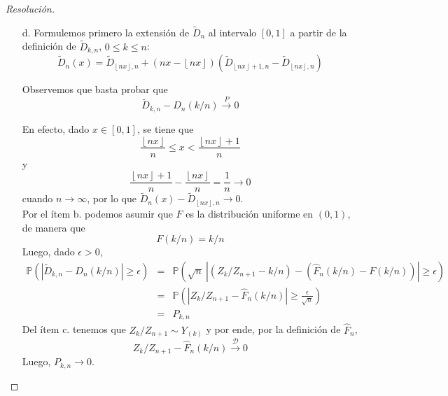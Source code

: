 \documentclass[a4paper,11pt]{article}
\newcommand{\abs}[1]{\ensuremath{\left\lvert #1 \right\rvert}}
\newcommand{\Prob}[1]{\ensuremath{\mathbb{P} \left( #1 \right)}}
\newcommand{\floor}[1]{\left\lfloor #1 \right\rfloor}
\newcommand{\Dn}[1]{\tilde{D}_{#1 ,n}}
\newcommand{\fnx}{\floor{nx}}
\newcommand{\fnxp}{\floor{nx}+1}
\begin{document}
\begin{proof}[Resoluci\'on]
$ $ 
\begin{enumerate}
    \item[d.] Formulemos primero la extensión de $\tilde{D}_n$ al intervalo $[0,1]$
    a partir de la definición de $\Dn{k}$, $0 \leq k \leq n$:
    $$\tilde{D}_n(x) = \Dn{\floor{nx}} + (nx - \floor{nx}) (\Dn{\floor{nx} + 1} - \Dn{\floor{nx}})$$

    Observemos que basta probar que 
    $$\Dn{k} - D_n(k/n) \overset{P}{\longrightarrow} 0$$

    En efecto, dado $x \in [0,1]$, se tiene que
    $$\frac{\fnx}{n} \leq x < \frac{\fnxp}{n}$$
    y 
    $$\frac{\fnxp}{n} - \frac{\fnx}{n} = \frac{1}{n} \to 0$$
    cuando $n \to \infty$, por lo que $\tilde{D}_n(x) - \Dn{\fnx} \to 0$.\\

    Por el ítem b. podemos asumir que $F$ es la distribución uniforme en $(0,1)$, de manera que
    $$F(k/n) = k/n$$
    Luego, dado $\epsilon > 0$,
    \begin{eqnarray*}
        \Prob{\abs{\Dn{k} - D_n(k/n)} \geq \epsilon}
            &=& \Prob{\sqrt{n}~\abs{\left(Z_k/Z_{n+1} − k/n\right) - \left(\hat{F}_n(k/n) − F(k/n)\right)} \geq \epsilon} \\
            &=& \Prob{\abs{Z_k/Z_{n+1} - \hat{F}_n(k/n)} \geq \frac{\epsilon}{\sqrt{n}}} \\
            &=& P_{k,n}
    \end{eqnarray*}
    Del ítem c. tenemos que $Z_k/Z_{n+1} \sim Y_{(k)}$ y por ende, por la definición de $\hat{F}_n$,
    $$Z_k/Z_{n+1} - \hat{F}_n(k/n) \overset{\mathcal{D}}{\longrightarrow} 0$$
    Luego, $P_{k,n} \to 0$.


\end{enumerate}
\end{proof}
\end{document}
